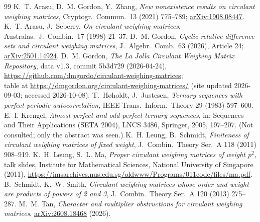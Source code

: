 \documentclass[11pt]{article}
\numberwithin{equation}{section}
\theoremstyle{definition}
\theoremstyle{remark}
\begin{document}
\begin{thebibliography}{99}
 K.~T. Arasu, D.~M. Gordon, Y.~Zhang, \emph{New nonexistence results on circulant
weighing matrices}, Cryptogr.\ Commun.\ 13 (2021) 775--789; \href{https://arxiv.org/abs/1908.08447}{arXiv:1908.08447}.
 K.~T. Arasu, J.~Seberry, \emph{On circulant weighing matrices}, Australas.\ J.\
Combin.\ 17 (1998) 21--37.
 D.~M. Gordon, \emph{Cyclic relative difference sets and circulant weighing
matrices}, J.\ Algebr.\ Comb.\ 63 (2026), Article 24; \href{https://arxiv.org/abs/2501.14924}{arXiv:2501.14924}.
\bibitem{GordonRepo} D.~M. Gordon, \emph{The La Jolla Circulant Weighing Matrix Repository},
data v1.3, commit 5b3d729 (2026-04-24),
\url{https://github.com/dmgordo/circulant-weighing-matrices};\\ table at
\url{https://dmgordon.org/circulant-weighing-matrices/} (site updated 2026-09-03; accessed
2026-10-08).
 T.~H{\o}holdt, J.~Justesen, \emph{Ternary sequences with perfect periodic
autocorrelation}, IEEE Trans.\ Inform.\ Theory 29 (1983) 597--600.
\bibitem{Kr04} E.~I. Krengel, \emph{Almost-perfect and odd-perfect ternary sequences}, in:
Sequences and Their Applications (SETA 2004), LNCS 3486, Springer, 2005, 197--207. (Not
consulted; only the abstract was seen.)
 K.~H. Leung, B.~Schmidt, \emph{Finiteness of circulant weighing matrices of fixed
weight}, J.\ Combin.\ Theory Ser.\ A 118 (2011) 908--919.
 K.~H. Leung, S.~L. Ma, \emph{Proper circulant weighing matrices of weight $p^2$}, talk slides,
Institute for Mathematical Sciences, National University of Singapore (2011),
\url{https://imsarchives.nus.edu.sg/oldwww/Programs/011code/files/ma.pdf}.
\bibitem{SS13} B.~Schmidt, K.~W. Smith, \emph{Circulant weighing matrices whose order and weight
are products of powers of 2 and 3}, J.\ Combin.\ Theory Ser.\ A 120 (2013) 275--287.
\bibitem{Tan26} M.~M. Tan, \emph{Character and multiplier obstructions for circulant weighing
matrices}, \href{https://arxiv.org/abs/2608.18468}{arXiv:2608.18468} (2026).
\end{thebibliography}
\end{document}
